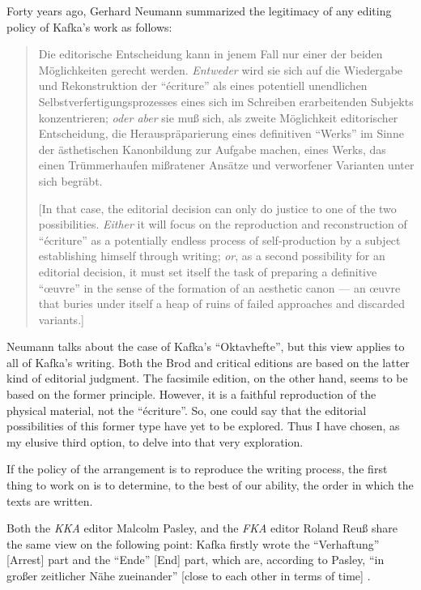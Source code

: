 \begin{paper}
Forty years ago, Gerhard Neumann summarized the legitimacy of any
editing policy of Kafka's work as follows:

\begin{quote}
Die editorische Entscheidung kann in jenem Fall nur einer der beiden
Möglichkeiten gerecht werden. \emph{Entweder} wird sie sich auf die
Wiedergabe und Rekonstruktion der ``écriture'' als eines potentiell
unendlichen \mbox{Selbstverfertigungsprozesses} eines sich im Schreiben
erarbeitenden Subjekts konzentrieren; \emph{oder aber} sie muß sich, als
zweite Möglichkeit editorischer Entscheidung, die Herauspräparierung
eines definitiven ``Werks'' im Sinne der ästhetischen Kanonbildung zur
Aufgabe machen, eines Werks, das einen Trümmerhaufen mißratener Ansätze
und verworfener Varianten unter sich begräbt. 

\begin{flushright}
    \parencite[161; emphasis in original]{neumann_werk_1981}
\end{flushright}

{[}In that case, the editorial decision can only do justice to one of
the two possibilities. \emph{Either} it will focus on the reproduction
and reconstruction of ``écriture'' as a potentially endless process of
self-production by a subject establishing himself through writing;
\emph{or}, as a second possibility for an editorial decision, it must
set itself the task of preparing a definitive ``œuvre'' in the sense of
the formation of an aesthetic canon –– an œuvre that buries under itself
a heap of ruins of failed approaches and discarded variants.{]}
\end{quote}

Neumann talks about the case of Kafka's ``Oktavhefte'', but this view
applies to all of Kafka's writing. Both the Brod and critical editions
are based on the latter kind of editorial judgment. The facsimile edition, on the other hand, seems to be based on the former principle.
However, it is a faithful reproduction of the physical material, not the
``écriture''. So, one could say that the editorial possibilities of this
former type have yet to be explored. Thus I have chosen, as my elusive
third option, to delve into that very exploration.

If the policy of the arrangement is to reproduce the writing process,
the first thing to work on is to determine, to the best of our ability,
the order in which the texts are written.

Both the \emph{KKA} editor Malcolm Pasley, and the \emph{FKA} editor
Roland Reuß share the same view on the following point: Kafka firstly
wrote the ``Verhaftung'' {[}Arrest{]} part and the ``Ende''
{[}End{]} part, which are, according to Pasley, ``in großer zeitlicher Nähe
zueinander'' {[}close to each other in terms of time{]} \citep[111]{kafka_zur_1990}.


\end{paper}
